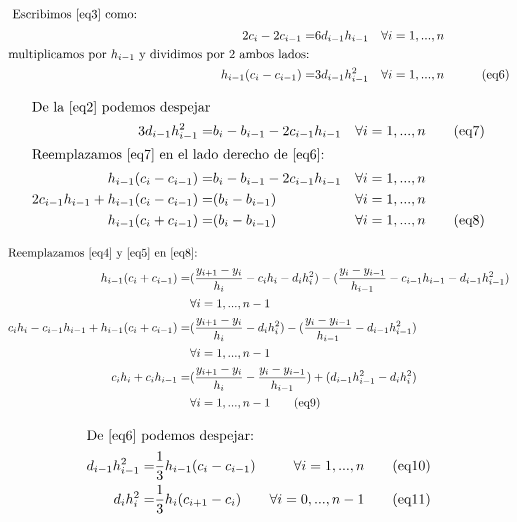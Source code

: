 \begin{align*}
\intertext{ Escribimos \eqref{eq3} como: } 
2c_i-2c_{i-1} = & 6d_{i-1}h_{i-1}		  & & \forall i= 1, ..., n \\
\text{multiplicamos por } h_{i-1} \text{ y dividimos por 2 ambos lados: } \\
h_{i-1}(c_i-c_{i-1}) = & 3d_{i-1}h_{i-1}^2 		 & & \forall i= 1, ..., n  & \tag{eq6} \label{eq6} \\
\end{align*}

\begin{align*}
\intertext{De la \eqref{eq2} podemos despejar } 
3d_{i-1}h_{i-1}^2 = & b_i - b_{i-1} - 2c_{i-1}h_{i-1} & & \forall i= 1, ..., n  \tag{eq7} \label{eq7} \\
\intertext{Reemplazamos \eqref{eq7} en el lado derecho de \eqref{eq6}: } 
h_{i-1}(c_i-c_{i-1}) = & b_i - b_{i-1} - 2c_{i-1}h_{i-1} & & \forall i= 1, ..., n \\
2c_{i-1}h_{i-1} + h_{i-1}(c_i-c_{i-1}) = & (b_i-b_{i-1}) & & \forall i= 1, ..., n \\
h_{i-1}(c_i+c_{i-1}) = & (b_i-b_{i-1}) & & \forall i= 1, ..., n \tag{eq8} \label{eq8}
\end{align*}

\begin{align*}
\intertext{Reemplazamos \eqref{eq4} y \eqref{eq5} en \eqref{eq8}: } 
h_{i-1}(c_i+c_{i-1}) =  & (\frac{y_{i+1}-y_{i}}{h_{i}} - c_{i}h_{i} - d_{i}h_{i}^2) - (\frac{y_i-y_{i-1}}{h_{i-1}} - c_{i-1}h_{i-1} - d_{i-1}h_{i-1}^2)  \\
&   \forall i= 1, ..., n-1 \\
c_{i}h_{i} - c_{i-1}h_{i-1} + h_{i-1}(c_i+c_{i-1}) =  & (\frac{y_{i+1}-y_{i}}{h_{i}} - d_{i}h_{i}^2) - 
(\frac{y_i-y_{i-1}}{h_{i-1}} - d_{i-1}h_{i-1}^2) \\
&   \forall i= 1, ..., n-1  \\
c_{i}h_{i} +  c_ih_{i-1} =  & (\frac{y_{i+1}-y_{i}}{h_{i}} -  \frac{y_i-y_{i-1}}{h_{i-1}}) + (d_{i-1}h_{i-1}^2  - d_{i}h_{i}^2) \\
&   \forall i= 1, ..., n-1 \tag{eq9} \label{eq9} 
\end{align*}

\begin{align*}
\intertext{De \eqref{eq6} podemos despejar: }
d_{i-1}h_{i-1}^2 = & \frac{1}{3}h_{i-1}(c_i-c_{i-1}) & \forall i= 1, ..., n \tag{eq10} \label{eq10}\\
d_{i}h_{i}^2 = & \frac{1}{3}h_{i}(c_{i+1}-c_{i}) & \forall i= 0, ..., n-1 \tag{eq11} \label{eq11}\\
\end{align*}

